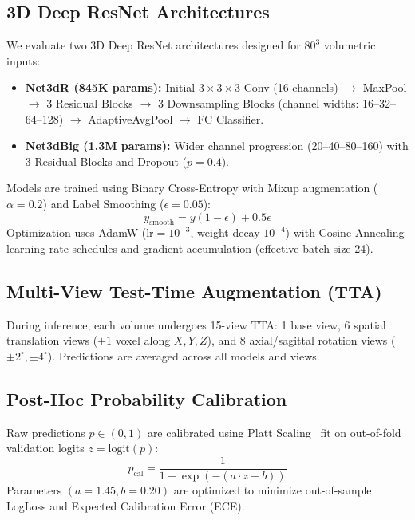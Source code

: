 \subsection{3D Deep ResNet Architectures}
\label{sec:arch}

We evaluate two 3D Deep ResNet architectures designed for $80^3$ volumetric inputs:
\begin{itemize}
    \item \textbf{Net3dR (845K params):} Initial $3\times3\times3$ Conv (16 channels) $\to$ MaxPool $\to$ 3 Residual Blocks $\to$ 3 Downsampling Blocks (channel widths: 16--32--64--128) $\to$ AdaptiveAvgPool $\to$ FC Classifier.
    \item \textbf{Net3dBig (1.3M params):} Wider channel progression (20--40--80--160) with 3 Residual Blocks and Dropout ($p=0.4$).
\end{itemize}

Models are trained using Binary Cross-Entropy with Mixup augmentation ($\alpha=0.2$) and Label Smoothing ($\epsilon=0.05$):
\begin{equation}
y_{\text{smooth}} = y(1 - \epsilon) + 0.5\epsilon
\end{equation}
Optimization uses AdamW ($\text{lr}=10^{-3}$, weight decay $10^{-4}$) with Cosine Annealing learning rate schedules and gradient accumulation (effective batch size 24).

\subsection{Multi-View Test-Time Augmentation (TTA)}
\label{sec:tta}

During inference, each volume undergoes 15-view TTA: 1 base view, 6 spatial translation views ($\pm 1$ voxel along $X, Y, Z$), and 8 axial/sagittal rotation views ($\pm 2^\circ, \pm 4^\circ$). Predictions are averaged across all models and views.

\subsection{Post-Hoc Probability Calibration}
\label{sec:calibration}

Raw predictions $p \in (0, 1)$ are calibrated using Platt Scaling~\cite{platt1999probabilistic} fit on out-of-fold validation logits $z = \text{logit}(p)$:
\begin{equation}
p_{\text{cal}} = \frac{1}{1 + \exp(-(a \cdot z + b))}
\end{equation}
Parameters $(a=1.45, b=0.20)$ are optimized to minimize out-of-sample LogLoss and Expected Calibration Error (ECE).